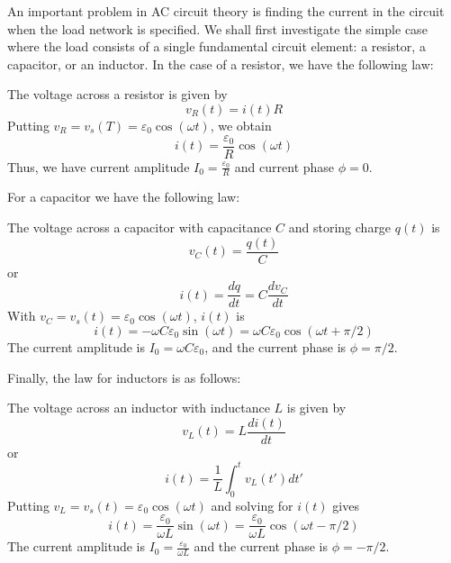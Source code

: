 An important problem in AC circuit theory is finding the current in the circuit when the load network is specified. We shall first investigate the simple case where the load consists of a single fundamental circuit element: a resistor, a capacitor, or an inductor. In the case of a resistor, we have the following law:

\begin{thm}
    The voltage across a resistor is given by $$v_R(t) = i(t)R$$ Putting $v_R = v_s(T) = \varepsilon_0\cos(\omega t)$, we obtain $$i(t) = \frac{\varepsilon_0}{R}\cos(\omega t)$$ Thus, we have current amplitude $I_0 = \frac{\varepsilon_0}{R}$ and current phase $\phi = 0$.
\end{thm}

For a capacitor we have the following law:

\begin{thm}
    The voltage across a capacitor with capacitance $C$ and storing charge $q(t)$ is $$v_C(t) = \frac{q(t)}{C}$$ or $$i(t) = \frac{dq}{dt} = C\frac{dv_C}{dt}$$ With $v_C = v_s(t) = \varepsilon_0\cos(\omega t)$, $i(t)$ is $$i(t) = -\omega C\varepsilon_0\sin(\omega t) = \omega C\varepsilon_0\cos(\omega t+\pi/2)$$ The current amplitude is $I_0 = \omega C\varepsilon_0$, and the current phase is $\phi = \pi/2$.
\end{thm}

Finally, the law for inductors is as follows:

\begin{thm}
    The voltage across an inductor with inductance $L$ is given by $$v_L(t) = L\frac{di(t)}{dt}$$ or $$i(t) = \frac{1}{L}\int_0^tv_L(t')dt'$$ Putting $v_L = v_s(t) = \varepsilon_0\cos(\omega t)$ and solving for $i(t)$ gives $$i(t) = \frac{\varepsilon_0}{\omega L}\sin(\omega t) = \frac{\varepsilon_0}{\omega L}\cos(\omega t - \pi/2)$$ The current amplitude is $I_0 = \frac{\varepsilon_0}{\omega L}$ and the current phase is $\phi = -\pi/2$.
\end{thm}

